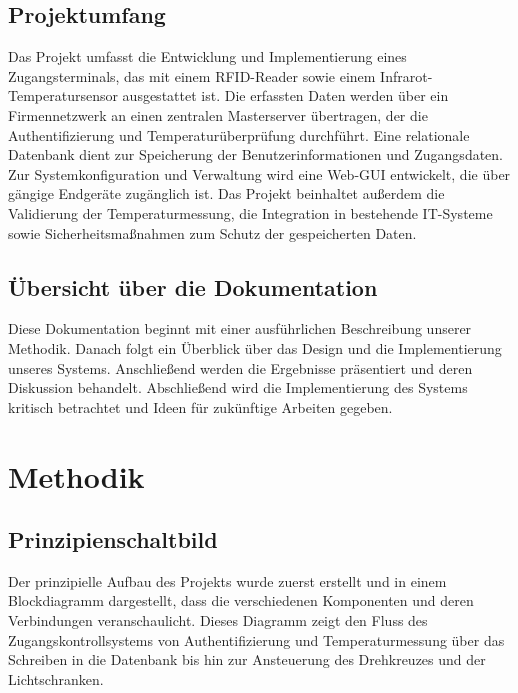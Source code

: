 \subsection{Projektumfang}

Das Projekt umfasst die Entwicklung und Implementierung eines Zugangsterminals, das mit einem RFID-Reader sowie einem Infrarot-Temperatursensor ausgestattet ist. Die erfassten Daten werden über ein Firmennetzwerk an einen zentralen Masterserver übertragen, der die Authentifizierung und Temperaturüberprüfung durchführt. Eine relationale Datenbank dient zur Speicherung der Benutzerinformationen und Zugangsdaten. Zur Systemkonfiguration und Verwaltung wird eine Web-GUI entwickelt, die über gängige Endgeräte zugänglich ist. Das Projekt beinhaltet außerdem die Validierung der Temperaturmessung, die Integration in bestehende IT-Systeme sowie Sicherheitsmaßnahmen zum Schutz der gespeicherten Daten.

\subsection{Übersicht über die Dokumentation}

Diese Dokumentation beginnt mit einer ausführlichen Beschreibung unserer Methodik. Danach folgt ein Überblick über das Design und die Implementierung unseres Systems. Anschließend werden die Ergebnisse präsentiert und deren Diskussion behandelt. Abschließend wird die Implementierung des Systems kritisch betrachtet und Ideen für zukünftige Arbeiten gegeben.

\section{Methodik}\label{sec:methodik}

\subsection{Prinzipienschaltbild}\label{subsec:prinzipienschaltbild}

Der prinzipielle Aufbau des Projekts wurde zuerst erstellt und in einem Blockdiagramm dargestellt, dass die verschiedenen Komponenten und deren Verbindungen veranschaulicht. Dieses Diagramm zeigt den Fluss des Zugangskontrollsystems von Authentifizierung und Temperaturmessung über das Schreiben in die Datenbank bis hin zur Ansteuerung des Drehkreuzes und der Lichtschranken.

